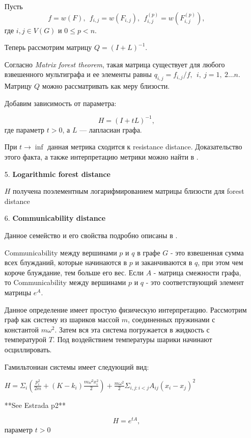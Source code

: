\begin{itemize}
Пусть 
$$f = w(F),\ \  f_{i,j} = w(F_{i,j}),\ \  f_{i,j}^{(p)} = w(F_{i,j}^{(p)}),$$ 
где $i,j \in V(G)$ и $0 \le p < n$.

Теперь рассмотрим матрицу $Q = (I + L)^{-1}$.

Согласно \emph{Matrix forest theorem}, такая матрица существует для любого взвешенного мультиграфа и ее элементы равны $q_{i,j} = f_{i,j}/f,\ \ i,\ j = 1,\ 2\ldots n$. Матрицу $Q$ можно рассматривать как меру близости. 

Добавим зависимость от параметра:

\begin{equation}
H = (I + tL) ^{-1}, 
\end{equation} 
где параметр $t > 0$, а $L$ --- лапласиан графа.

При $t \to \inf$ данная метрика сходится к resistance distance. Доказательство этого факта, а также интерпретацию метрики можно найти в \cite{chebotarev2012walk}.

\item[5.] \textbf{Logarithmic forest distance}

$H$ получена поэлементным логарифмированием матрицы близости для forest distance

\item[6.] \textbf{Communicability distance}

Данное семейство и его свойства подробно описаны в \cite{estrada2012communicability}.

Communicability между вершинами $p$ и $q$ в графе $G$ - это взвешенная сумма всех блужданий, которые начинаются в $p$ и заканчиваются в $q$, при этом чем короче блуждание, тем больше его вес. Если $A$ - матрица смежности графа, то Communicability между вершинами $p$ и $q$ - это соответствующий элемент матрицы $e^{A}$. 

Данное определение имеет простую физическую интерпретацию. Рассмотрим граф как систему из шариков массой $m$, соединенных пружинами с константой $m \omega ^2$. Затем вся эта система погружается в жидкость с температурой $T$. Под воздействием температуры шарики начинают осциллировать.

Гамильтониан системы имеет следующий вид:

$H = \Sigma _i (\frac{p_i^2}{2m} + (K-k_i)\frac{m\omega ^2 x_i^2}{2}) + \frac{m \omega ^2}{2} \Sigma _{i,j : i<j } A_{ij} (x_i-x_j)^2 $

**See Estrada p2**

\begin{equation}
H = e^{tA},
\end{equation}
 параметр $t > 0$


\end{itemize}
